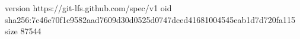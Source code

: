 version https://git-lfs.github.com/spec/v1
oid sha256:7c46e70f1c9582aad7609d30d0525d0747dced41681004545eab1d7d720fa115
size 87544
